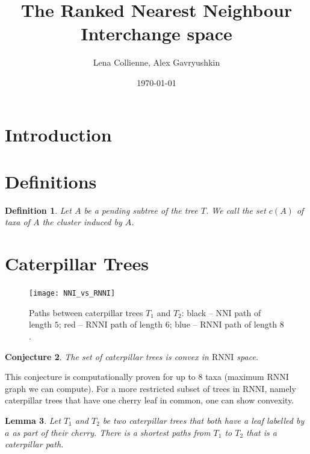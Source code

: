 \documentclass[11pt, a4paper]{article}
\title{The Ranked Nearest Neighbour Interchange space}
\date{\today}
\author{Lena Collienne, Alex Gavryushkin}
\newcommand{\nni}{\mathrm{NNI}}
\newcommand{\rnni}{\mathrm{RNNI}}
\newtheorem{definition}{Definition}
\newtheorem{conjecture}[definition]{Conjecture}
\newtheorem{lemma}[definition]{Lemma}
\begin{document}
\maketitle

\begin{abstract}
	
\end{abstract}


\section{Introduction}

\section{Definitions}




\begin{definition}
	Let $A$ be a pending subtree of the tree $T$.
	We call the set $c(A)$ of taxa of $A$ the \emph{cluster} induced by $A$.
\end{definition}

\section{Caterpillar Trees}

\begin{figure}[H]
	\centering
	\texttt{[image: NNI\_vs\_RNNI]}
	\caption{Paths between caterpillar trees $T_1$ and $T_2$: black -- $\nni$ path of length $5$; red -- $\rnni$ path of length $6$; blue -- $\rnni$ path of length $8$.}
	\label{NNI_vs_RNNI}
\end{figure}

\begin{conjecture}
	The set of caterpillar trees is convex in $\rnni$ space.
\end{conjecture}

This conjecture is computationally proven for up to $8$ taxa (maximum $\rnni$ graph we can compute).
For a more restricted subset of trees in $\rnni$, namely caterpillar trees that have one cherry leaf in common, one can show convexity.

\begin{lemma}
	Let $T_1$ and $T_2$ be two caterpillar trees that both have a leaf labelled by $a$ as part of their cherry.
	There is a shortest paths from $T_1$ to $T_2$ that is a caterpillar path.
	\label{lemma:caterpillar_subset_convex}
\end{lemma}
\end{document}
